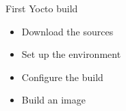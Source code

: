 \setuplabframe
{First Yocto build}
{
  \begin{itemize}
    \item Download the sources
    \item Set up the environment
    \item Configure the build
    \item Build an image
  \end{itemize}
}
